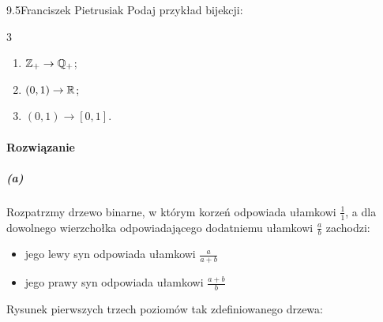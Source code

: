 
\begin{problem}{9.5}{Franciszek Pietrusiak}
Podaj przykład bijekcji:
\begin{multicols}{3}
\begin{enumerate}
    \item $\mathbb{Z}_+\to\mathbb{Q}_+$;
    \item $(0,1)\to\mathbb{R}$;
    \item $(0,1)\to[0,1]$.
\end{enumerate}
\end{multicols}
\end{problem}


\paragraph{Rozwiązanie} %

\subparagraph{(a)}
Rozpatrzmy drzewo binarne, w którym korzeń odpowiada ułamkowi $\frac{1}{1}$,
a dla dowolnego wierzchołka odpowiadającego dodatniemu ułamkowi $\frac{a}{b}$
zachodzi:
\begin{itemize}
    \item jego lewy syn odpowiada ułamkowi $\frac{a}{a+b}$
    \item jego prawy syn odpowiada ułamkowi $\frac{a+b}{b}$
\end{itemize}

Rysunek pierwszych trzech poziomów tak zdefiniowanego drzewa:

\begin{center}
\end{center}

